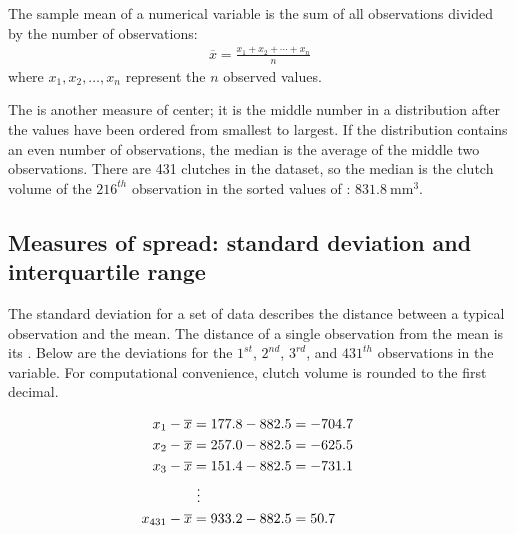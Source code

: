 

\begin{termBox}{%
		The sample mean of a numerical variable is the sum of all observations divided by the number of observations:
		\begin{eqnarray}
		\overline{x} = \frac{x_1+x_2+\cdots+x_n}{n}
		\label{meanEquation}
		\end{eqnarray}
		where $x_1, x_2, \dots, x_n$ represent the $n$ observed values.}
\end{termBox}

The  is another measure of center; it is the middle number in a distribution after the values have been ordered from smallest to largest. If the distribution contains an even number of observations, the median is the average of the middle two observations. There are 431 clutches in the dataset, so the median is the clutch volume of the $216^{th}$ observation in the sorted values of : $831.8\ \textrm{mm}^{3}$.

\subsection{Measures of spread: standard deviation and interquartile range}
\label{measuresOfSpread}

The standard deviation for a set of data describes the distance between a typical observation and the mean. The distance of a single observation from the mean is its . Below are the deviations for the $1^{st}$, $2^{nd}$, $3^{rd}$, and $431^{th}$ observations in the  variable. For computational convenience, clutch volume is rounded to the first decimal.

\begin{align*}
x_1-\overline{x} &= 177.8 - 882.5 = -704.7 \hspace{5mm}\text{ } \\
x_2-\overline{x} &= 257.0 - 882.5 = -625.5 \\
x_3-\overline{x} &= 151.4 - 882.5 = -731.1 \\
&\ \vdots \\
x_{431}-\overline{x} &= 933.2 - 882.5 = 50.7
\end{align*}

